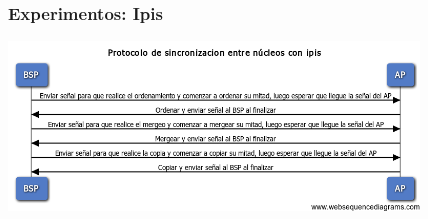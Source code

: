 \documentclass{beamer}
\begin{document}
\begin{frame}
  \frametitle{Experimentos: Ipis}
  \begin{center}
  \includegraphics[height=4.5cm]{images/ipis-sorting-seq.png}
  \end{center}
\end{frame}

\end{document}
